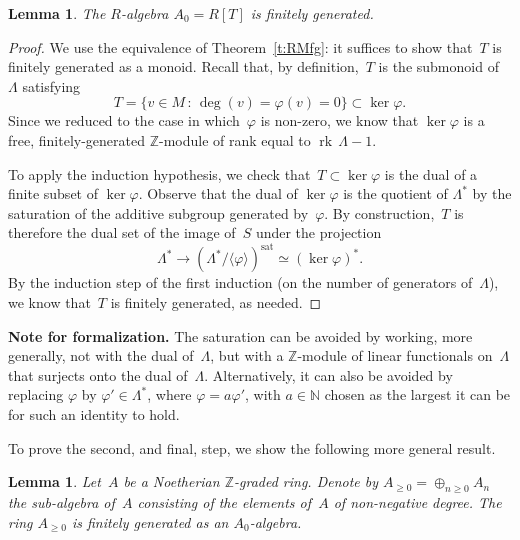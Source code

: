 \documentclass{amsart}
\newcommand{\N}{\mathbb{N}}
\newcommand{\Z}{\mathbb{Z}}
\newcommand{\Az}{A_{\geq0}}
\newcommand{\form}[1]{\medskip
\parbox{330pt}
{\small{{\textbf{Note for formalization.}}
#1}}
\medskip}
\DeclareMathOperator{\rk}{rk\,}
\newtheorem{lemma}[theorem]{Lemma}
\begin{document}
\begin{lemma}
The $R$-algebra $A_0 = R[T]$ is finitely generated.
\end{lemma}
\begin{proof}
We use the equivalence of Theorem~\ref{t:RMfg}: it suffices to show that~$T$ is finitely generated as a monoid.  Recall that, by definition,~$T$ is the submonoid of~$\Lambda$ satisfying
\[
T=\{v \in M \,:\, \deg(v) = \varphi (v) = 0\} \subset \ker \varphi .
\]
Since we reduced to the case in which~$\varphi$ is non-zero, we know that $\ker \varphi$ is a free, finitely-generated $\Z$-module of rank equal to ${\rk} \Lambda - 1$.

To apply the induction hypothesis, we check that~$T \subset \ker \varphi$ is the dual of a finite subset of $\ker \varphi$.  Observe that the dual of $\ker \varphi$ is the quotient of $\Lambda^*$ by the saturation of the additive subgroup generated by~$\varphi$.  By construction,~$T$ is therefore the dual set of the image of~$S$ under the projection
\[
\Lambda^* \to \left( \Lambda^* / \langle \varphi \rangle \right)^{\textrm{sat}} \simeq \left( \ker \varphi \right)^*.
\]
By the induction step of the first induction (on the number of generators of~$\Lambda$), we know that~$T$ is finitely generated, as needed.
\end{proof}


\form{The saturation can be avoided by working, more generally, not with the dual of~$\Lambda$, but with a $\Z$-module of linear functionals on~$\Lambda$ that surjects onto the dual of~$\Lambda$.  Alternatively, it can also be avoided by replacing $\varphi$ by $\varphi' \in \Lambda^*$, where $\varphi = a \varphi'$, with $a \in \N$ chosen as the largest it can be for such an identity to hold.}

To prove the second, and final, step, we show the following more general result.

\begin{lemma}
Let~$A$ be a Noetherian $\Z$-graded ring.  Denote by $\Az = \oplus_{n \geq 0} A_n$ the sub-algebra of~$A$ consisting of the elements of~$A$ of non-negative degree.  The ring $\Az$ is finitely generated as an $A_0$-algebra.
\end{lemma}
\end{document}
